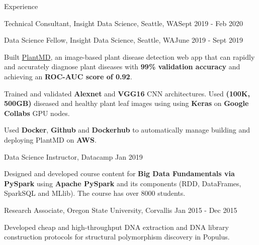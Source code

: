 \documentclass{resume} %
\begin{document}
\begin{rSection}{Experience }
\begin{rSubsection}{Technical Consultant, Insight Data Science, Seattle, WA}{Sept 2019 - Feb 2020}{}
\vspace{-7pt}

\end{rSubsection}

\begin{rSubsection}{Data Science Fellow, Insight Data Science, Seattle, WA}{June 2019 - Sept 2019}{}

\vspace{-3pt}

\item Built \href{http://plantmd.onrender.com}{PlantMD}, an image-based plant disease detection web app that can rapidly and accurately diagnose plant diseases with \textbf{99\% validation accuracy} and achieving an \textbf{ROC-AUC score of 0.92}.
\item Trained and validated \textbf{Alexnet} and \textbf{VGG16} CNN architectures. Used \textbf{(100K, 500GB)} diseased and healthy plant leaf images using  using \textbf{Keras} on \textbf{Google Collabs} GPU nodes.
\item Used \textbf{Docker}, \textbf{Github} and \textbf{Dockerhub} to automatically manage building and deploying PlantMD on \textbf{AWS}.
\end{rSubsection} 

\vspace{-7pt}

\begin{rSubsection}{Data Science Instructor, Datacamp}
{Jan 2019}{}{}  %
\vspace{-3pt}
\item Designed and developed course content for \textbf{Big Data Fundamentals via PySpark} using \textbf{Apache PySpark} and its components (RDD, DataFrames, SparkSQL and MLlib). The course has over 8000 students.
\vspace{-7pt}
\end{rSubsection}  

\begin{rSubsection}{Research Associate, Oregon State University, Corvallis}
{Jan 2015 - Dec 2015}{}{}  %
\vspace{-3pt}

\item Developed cheap and high-throughput DNA extraction and DNA library construction protocols for structural polymorphism discovery in Populus.

\vspace{-7pt}

\end{rSubsection}  


\end{rSection}
\end{document}
